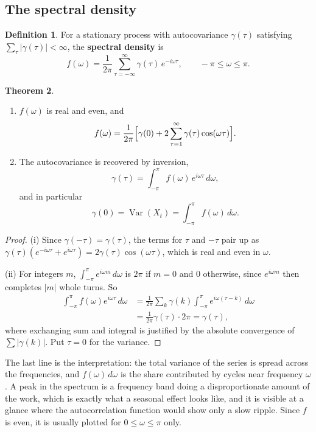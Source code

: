 \documentclass[11pt,a4paper]{article}
\theoremstyle{definition}
\newtheorem{thm}{Theorem}[subsection]
\newtheorem{defn}[thm]{Definition}
\DeclareMathOperator{\Var}{Var}
\begin{document}
\subsection{The spectral density}

\begin{defn}
For a stationary process with autocovariance $\gamma(\tau)$ satisfying $\sum_\tau|\gamma(\tau)| < \infty$, the \textbf{spectral density} is
\[
f(\omega) = \frac{1}{2\pi}\sum_{\tau=-\infty}^{\infty}\gamma(\tau)\,e^{-i\omega\tau} , \qquad -\pi \le \omega \le \pi .
\]
\end{defn}

\begin{thm}\label{thm:spectral}
\begin{enumerate}[label=(\roman*)]
\item $f(\omega)$ is real and even, and
\[
f(\omega) = \frac{1}{2\pi}\Bigl[\gamma(0) + 2\sum_{\tau=1}^\infty\gamma(\tau)\cos(\omega\tau)\Bigr] .
\]
\item The autocovariance is recovered by inversion,
\[
\gamma(\tau) = \int_{-\pi}^{\pi}f(\omega)\,e^{i\omega\tau}\,d\omega ,
\]
and in particular
\[
\gamma(0) = \Var(X_t) = \int_{-\pi}^{\pi}f(\omega)\,d\omega .
\]
\end{enumerate}
\end{thm}

\begin{proof}
(i) Since $\gamma(-\tau) = \gamma(\tau)$, the terms for $\tau$ and $-\tau$ pair up as $\gamma(\tau)(e^{-i\omega\tau} + e^{i\omega\tau}) = 2\gamma(\tau)\cos(\omega\tau)$, which is real and even in $\omega$.

(ii) For integers $m$, $\int_{-\pi}^{\pi}e^{i\omega m}\,d\omega$ is $2\pi$ if $m = 0$ and $0$ otherwise, since $e^{i\omega m}$ then completes $|m|$ whole turns. So
\begin{align*}
\int_{-\pi}^{\pi}f(\omega)e^{i\omega\tau}\,d\omega &= \frac{1}{2\pi}\sum_k\gamma(k)\int_{-\pi}^{\pi}e^{i\omega(\tau-k)}\,d\omega \\
&= \frac{1}{2\pi}\gamma(\tau)\cdot2\pi = \gamma(\tau) ,
\end{align*}
where exchanging sum and integral is justified by the absolute convergence of $\sum|\gamma(k)|$. Put $\tau = 0$ for the variance.
\end{proof}

The last line is the interpretation: the total variance of the series is spread across the frequencies,
and $f(\omega)\,d\omega$ is the share contributed by cycles near frequency $\omega$. A peak in the spectrum is a frequency band doing a
disproportionate amount of the work, which is exactly what a seasonal effect looks like, and it is visible at a
glance where the autocorrelation function would show only a slow ripple. Since $f$ is even, it is usually plotted
for $0 \le \omega \le \pi$ only.
\end{document}
